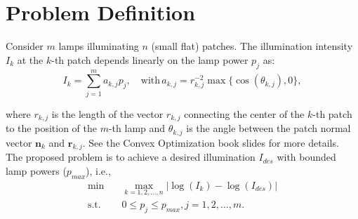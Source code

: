 \documentclass[11pt,a4paper]{article}
\begin{document}
\section{Problem Definition}

Consider $m$ lamps illuminating $n$ (small flat) patches. The illumination intensity $I_k$ at the $k$-th patch depends linearly on the lamp power $p_j$ as:
\begin{equation*}
    I_k = \displaystyle \sum_{j=1}^{m}a_{k,j}p_j, \quad \text{with} \, a_{k,j} = r_{k,j}^{-2}\max\{\cos(\theta_{k,j}),0\},
\end{equation*}

where $r_{k,j}$ is the length of the vector $r_{k,j}$ connecting the center of the $k$-th patch to the position of the $m$-th lamp and $\theta_{k,j}$ is the angle between the patch normal vector $\mathbf{n}_k$ and $\mathbf{r}_{k,j}$. See the Convex Optimization book slides for more details.\\

The proposed problem is to achieve a desired illumination $I_{des}$ with bounded lamp powers ($p_{max}$), i.e.,
\begin{align*}
    \min & \quad \underset{k=1,2,\dots,n}{\max}\vert \log{(I_k)} - \log{(I_{des})} \vert \\
    \text{s.t.} & \quad 0 \leq p_j \leq p_{max}, j = 1, 2, \dots, m.
\end{align*}
\end{document}
